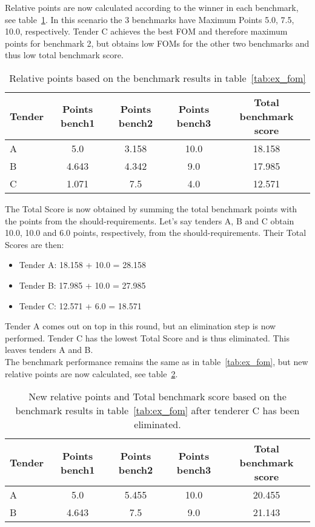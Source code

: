 \documentclass{article}
\begin{document}
Relative points are now calculated according to the winner in each
benchmark, see table~\ref{tab:ex_score}. In this scenario the 3 benchmarks have Maximum Points 5.0, 7.5, 10.0, respectively. Tender C achieves the best FOM and therefore maximum points for benchmark 2, but obtains low FOMs for the other two benchmarks and thus low total benchmark score.

\begin{table}[h]
\centering
\caption{Relative points based on the benchmark results in table~\ref{tab:ex_fom}}
\begin{tabular}{l|c|c|c|c}
\hline\hline
    Tender & Points bench1 & Points bench2 & Points bench3 & Total benchmark score \\ \hline
    A & 5.0 & 3.158 & 10.0 & 18.158 \\ \hline
    B & 4.643 & 4.342 & 9.0 & 17.985 \\ \hline
    C & 1.071 & 7.5 & 4.0 & 12.571 \\ \hline\hline
    \end{tabular}
    \label{tab:ex_score}
\end{table}


The Total Score is now obtained by summing the total benchmark 
points with the points from the should-requirements. Let's say 
tenders A, B and C obtain 10.0, 10.0 and 6.0 points, respectively, 
from the should-requirements. Their Total Scores are then:
\begin{itemize}
    \item Tender A: 18.158 + 10.0 = 28.158
    \item Tender B: 17.985 + 10.0 = 27.985
    \item Tender C: 12.571 + 6.0 = 18.571
\end{itemize}

Tender A comes out on top in this round, but an elimination step
is now performed. Tender C has the lowest Total Score and is thus
eliminated. This leaves tenders A and B. \\

The benchmark performance remains the same as in table~\ref{tab:ex_fom}, but new relative points are now calculated, see table~\ref{tab:ex_score2}.\\

\begin{table}[h]
\centering
\caption{New relative points and Total benchmark score based on the benchmark results in table~\ref{tab:ex_fom} after tenderer C has been eliminated.}
\begin{tabular}{l|c|c|c|c}
\hline\hline
    Tender & Points bench1 & Points bench2 & Points bench3 & Total benchmark score \\ \hline
    A & 5.0 & 5.455 & 10.0 & 20.455 \\ \hline
    B & 4.643 & 7.5 & 9.0 & 21.143 \\ \hline\hline
    \end{tabular}
    \label{tab:ex_score2}
\end{table}
\end{document}
